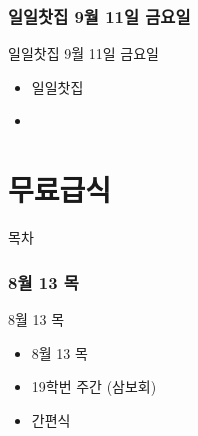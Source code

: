 \documentclass[aspectratio=1610,17pt,xcolor=pdftex,dvipsnames,table,handout]{beamer}
\begin{document}
		\section{일일찻집 9월 11일 금요일 }
		

		\begin{frame} [t,plain]
			\begin{block} {일일찻집 9월 11일 금요일 }
			\begin{itemize}
				\item 일일찻집
				\item 
			\end{itemize}
			\end{block}
		\end{frame}



		\part{무료급식}
		\frame{\partpage}


		\begin{frame} [plain]{목차}
		\tableofcontents
		\end{frame}
		

		\section{8월 13 목}
		\frame [plain] {\sectionpage}

		\begin{frame} [t,plain]
			\begin{block} {8월 13 목}
			\begin{itemize}
				\item 8월 13 목
  				\item 19학번 주간 (삼보회)
				\item  간편식
			\end{itemize}
			\end{block}
		\end{frame}


\end{document}
